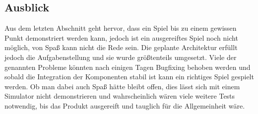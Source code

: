 \subsection{Ausblick}

Aus dem letzten Abschnitt geht hervor, dass ein Spiel bis zu einem gewissen Punkt demonstriert
werden kann, jedoch ist ein ausgereiftes Spiel noch nicht möglich, von Spaß kann nicht die Rede
sein.
Die geplante Architektur erfüllt jedoch die Aufgabenstellung und sie wurde größtenteils umgesetzt.
Viele der genannten Probleme könnten nach einigen Tagen Bugfixing behoben werden und sobald die
Integration der Komponenten stabil ist kann ein richtiges Spiel gespielt werden.
Ob man dabei auch Spaß hätte bleibt offen, dies lässt sich mit einem Simulator nicht demonstrieren
und wahrscheinlich wären viele weitere Tests notwendig, bis das Produkt ausgereift und tauglich für
die Allgemeinheit wäre.
